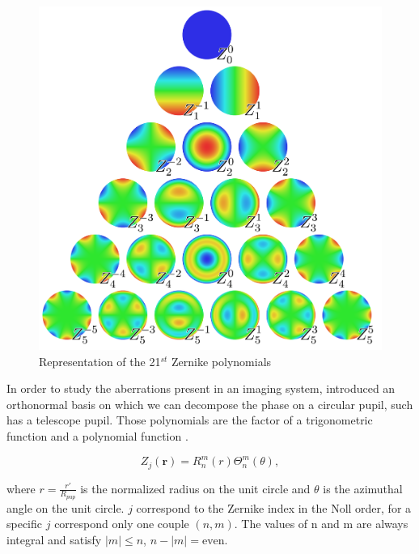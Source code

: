 \begin{figure}
\begin{center}
\includegraphics[width=\textwidth,angle=0]{Figures/Zernike_polynomials}
\decoRule
\caption[Representation of the 21$^{st}$ Zernike polynomials]{Representation of the 21$^{st}$ Zernike polynomials \citep{ZernikeWiki}}
\label{fig:Zernike_polynomials}
\end{center}
\end{figure}


In order to study the aberrations present in an imaging system, \citet{zernike1934} introduced an orthonormal basis on which we can decompose the phase on a circular pupil, such has a telescope pupil. Those polynomials are the factor of a trigonometric function and a polynomial function \citep{Noll_1976}.

\begin{equation}
Z_j(\mathbf{r}) = R_n^m(r)\Theta^m_n(\theta),
\label{eqt:ZernikePol}
\end{equation}

where $r=\frac{r'}{R_{pup}}$ is the normalized radius on the unit circle and $\theta$ is the azimuthal angle on the unit circle. $j$ correspond to the Zernike index in the Noll order, for a specific $j$ correspond only one couple $(n,m)$. The values of n and m are always integral and satisfy $|m| \leq n$, $n - |m| = \mathrm{even}$.

